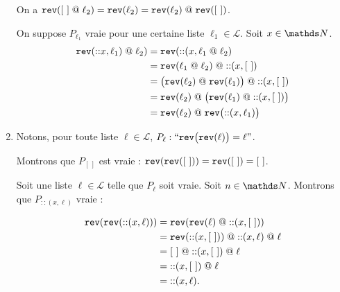 \begin{enumerate}
		On a ${\tt rev}\/([~]\mathrel@\ell_2) = {\tt rev}\/(\ell_2) = {\tt rev}\/(\ell_2)\mathrel@{\tt rev}\/([~])$.

		On suppose $P_{\ell_1}$\/ vraie pour une certaine liste $\ell_1 \in \mathcal{L}$.
		Soit $x \in \N$.
		\begin{align*}
			{\tt rev}\/({::}x, \ell_1)\mathrel@ \ell_2) &= {\tt rev}\/({::}(x, \ell_1\mathrel@\ell_2) \\
			&= {\tt rev}\/(\ell_1\mathrel@\ell_2) \mathrel@ {::}(x, [~]) \\
			&= \big({\tt rev}\/(\ell_2)\mathrel@{\tt rev}\/(\ell_1)\big) \mathrel@ {::}(x, [~]) \\
			&= {\tt rev}\/(\ell_2)\mathrel@ \big({\tt rev}\/(\ell_1) \mathrel@ {::}(x, [~])\big) \\
			&= {\tt rev}\/(\ell_2)\mathrel@{\tt rev}\/\big({::}(x, \ell_1)\big) \\
		\end{align*}
	\item Notons, pour toute liste $\ell \in \mathcal{L}$, $P_\ell : ``{\tt rev}\/\big({\tt rev}\/(\ell)\big) = \ell"$.

		Montrons que $P_{[~]}$\/ est vraie : ${\tt rev}\/({\tt rev}\/([~])) = {\tt rev}\/([~]) = [~]$.

		Soit une liste $\ell \in \mathcal{L}$\/ telle que $P_\ell$\/ soit vraie. Soit $n \in \N$. Montrons que $P_{{::}(x, \ell)}$\/ vraie :

		\begin{align*}
			{\tt rev}\/({\tt rev}\/({::}(x,\ell))) &= {\tt rev}\/({\tt rev}\/(\ell) \mathrel@ {::}(x,[~])) \\
			&= {\tt rev}\/({::}(x, [~])) \mathrel@{::}(x, \ell)\mathrel@\ell \\
			&= [~]\mathrel@{::}(x, [~])\mathrel@\ell \\
			&= {::}(x, [~]) \mathrel@\ell \\
			&= {::}(x, \ell). \\
		\end{align*}
\end{enumerate}

